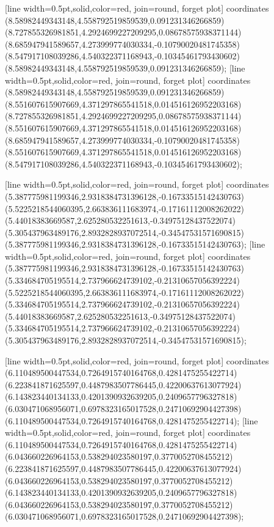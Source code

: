 [line width=0.5pt,solid,color=red, join=round, forget plot] coordinates {(8.58982449343148,4.558792519859539,0.091231346266859) (8.727855326981851,4.2924699227209295,0.08678575938371144) (8.685947941589657,4.273999774030334,-0.10790020481745358) (8.547917108039286,4.540322371168943,-0.10345461793430602) (8.58982449343148,4.558792519859539,0.091231346266859)};
[line width=0.5pt,solid,color=red, join=round, forget plot] coordinates {(8.58982449343148,4.558792519859539,0.091231346266859) (8.551607615907669,4.371297865541518,0.014516126952203168) (8.727855326981851,4.2924699227209295,0.08678575938371144) (8.551607615907669,4.371297865541518,0.014516126952203168) (8.685947941589657,4.273999774030334,-0.10790020481745358) (8.551607615907669,4.371297865541518,0.014516126952203168) (8.547917108039286,4.540322371168943,-0.10345461793430602)};

[line width=0.5pt,solid,color=red, join=round, forget plot] coordinates {(5.387775981199346,2.9318384731396128,-0.16733515142430763) (5.5225218544060395,2.663836111683974,-0.17161112008262022) (5.44018383669587,2.625280532251613,-0.34975128437522074) (5.305437963489176,2.8932828937072514,-0.34547531571690815) (5.387775981199346,2.9318384731396128,-0.16733515142430763)};
[line width=0.5pt,solid,color=red, join=round, forget plot] coordinates {(5.387775981199346,2.9318384731396128,-0.16733515142430763) (5.334684705195514,2.737966624739102,-0.21310657056392224) (5.5225218544060395,2.663836111683974,-0.17161112008262022) (5.334684705195514,2.737966624739102,-0.21310657056392224) (5.44018383669587,2.625280532251613,-0.34975128437522074) (5.334684705195514,2.737966624739102,-0.21310657056392224) (5.305437963489176,2.8932828937072514,-0.34547531571690815)};

[line width=0.5pt,solid,color=red, join=round, forget plot] coordinates {(6.110489500447534,0.7264915740164768,0.4281475255422714) (6.223841871625597,0.4487983507786445,0.42200637613077924) (6.143823440134133,0.4201390932639205,0.2409657796327818) (6.030471068956071,0.6978323165017528,0.24710692904427398) (6.110489500447534,0.7264915740164768,0.4281475255422714)};
[line width=0.5pt,solid,color=red, join=round, forget plot] coordinates {(6.110489500447534,0.7264915740164768,0.4281475255422714) (6.043660226964153,0.538294023580197,0.3770052708455212) (6.223841871625597,0.4487983507786445,0.42200637613077924) (6.043660226964153,0.538294023580197,0.3770052708455212) (6.143823440134133,0.4201390932639205,0.2409657796327818) (6.043660226964153,0.538294023580197,0.3770052708455212) (6.030471068956071,0.6978323165017528,0.24710692904427398)};

